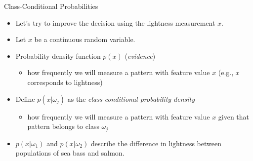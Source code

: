 \begin{frame}{Class-Conditional Probabilities}
\begin{itemize}
\item Let's try to improve the decision using the lightness
measurement $x$.
\item Let $x$ be a continuous random variable.
\item Probability density function $p(x)$ (\textit{\color{mycolor1}evidence})
\begin{itemize}
\item how frequently we will measure a pattern with feature value $x$ (e.g., $x$ corresponds to lightness)
\end{itemize}
\item Define $p(x|\omega_j )$ as the \textit{\color{mycolor1}class-conditional probability density}
\begin{itemize}
\item how frequently we will measure a pattern with feature value $x$ given that pattern belongs to class $\omega_j$
\end{itemize}
\item $p(x|\omega_1)$ and $p(x|\omega_2)$ describe the difference in lightness
between populations of sea bass and salmon.
\end{itemize}
\end{frame}



